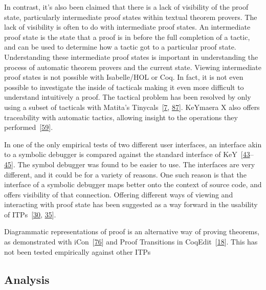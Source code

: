 \documentclass[
]{article}
\begin{document}
In contrast, it's also been claimed that there is a lack of visibility
of the proof state, particularly intermediate proof states within
textual theorem provers. The lack of visibility is often to do with
intermediate proof states. An intermediate proof state is the state that
a proof is in before the full completion of a tactic, and can be used to
determine how a tactic got to a particular proof state. Understanding
these intermediate proof states is important in understanding the
process of automatic theorem provers and the current state. Viewing
intermediate proof states is not possible with Isabelle/HOL or Coq. In
fact, it is not even possible to investigate the inside of tacticals
making it even more difficult to understand intuitively a proof. The
tactical problem has been resolved by only using a subset of tacticals
with Matita's Tinycals~{[}\protect\hyperlink{ref-asperti_user_2007}{7},
\protect\hyperlink{ref-zacchiroli_user_2007}{87}{]}. KeYmaera X also
offers traceability with automatic tactics, allowing insight to the
operations they
performed~{[}\protect\hyperlink{ref-mitsch_keymaera_2017}{59}{]}.

In one of the only empirical tests of two different user interfaces, an
interface akin to a symbolic debugger is compared against the standard
interface of
KeY~{[}\protect\hyperlink{ref-hentschel_integrating_2016}{43}--\protect\hyperlink{ref-hentschel_interactive_2016}{45}{]}.
The symbol debugger was found to be easier to use. The interfaces are
very different, and it could be for a variety of reasons. One such
reason is that the interface of a symbolic debugger maps better onto the
context of source code, and offers visibility of that connection.
Offering different ways of viewing and interacting with proof state has
been suggested as a way forward in the usability of
ITPs~{[}\protect\hyperlink{ref-eastaughffe_support_1998}{30},
\protect\hyperlink{ref-grebing_seamless_2020}{35}{]}.

Diagrammatic representations of proof is an alternative way of proving
theorems, as demonstrated with
iCon~{[}\protect\hyperlink{ref-shams_accessible_2018}{76}{]} and Proof
Transitions in
CoqEdit~{[}\protect\hyperlink{ref-berman_development_2014}{18}{]}. This
has not been tested empirically against other ITPs

\hypertarget{analysis}{%
\subsection{Analysis}\label{analysis}}
\end{document}
